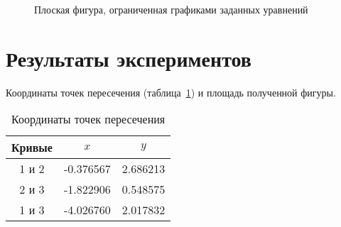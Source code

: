 \documentclass[a4paper,12pt,titlepage,finall]{article}
\begin{document}
\begin{figure}[h]
\centering
{}
\caption{Плоская фигура, ограниченная графиками заданных уравнений}
\label{plot1}
\end{figure}

\newpage

\section{Результаты экспериментов}

Координаты точек пересечения (таблица~\ref{table1}) и площадь полученной фигуры.

\begin{table}[h]
\centering
\begin{tabular}{|c|c|c|}
\hline
Кривые & $x$ & $y$ \\
\hline
1 и 2 & -0.376567 & 2.686213 \\
2 и 3 & -1.822906 & 0.548575 \\
1 и 3 & -4.026760 & 2.017832 \\
\hline
\end{tabular}
\caption{Координаты точек пересечения}
\label{table1}
\end{table}
\end{document}
